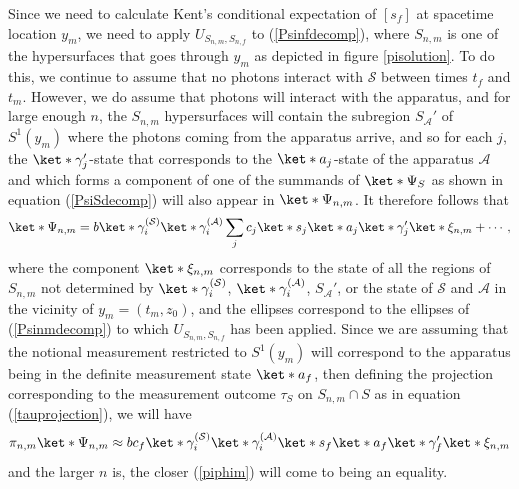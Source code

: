 \documentclass[12pt]{report}
\begin{document}
Since we need to calculate Kent's conditional expectation of $[s_f]$ at spacetime location $y_m$, we need to apply  $U_{S_{n,m},S_{n,f}}$ to (\ref{Psinfdecomp}), where $S_{n,m}$ %
%
 is one of the hypersurfaces that goes through $y_m$ as depicted in figure \ref{pisolution}. To do this, we continue to assume that no photons interact with $\mathcal{S}$ between times $t_f$ and $t_m$. However, we do assume that photons will interact with the apparatus, and for large enough $n$, the $S_{n,m}$ hypersurfaces will contain the subregion $S_{\mathcal{A}}'$ of $S^1(y_m)$ where the photons coming from the apparatus arrive, and so for each $j$, the $\ket*{\gamma_j'}$-state %
%
 that corresponds to the $\ket*{a_j}$-state of the apparatus $\mathcal{A}$ and which forms a component of one of the summands of $\ket*{\Psi_S}$ as shown in equation (\ref{PsiSdecomp}) will also appear in $\ket*{\Psi_{n,m}}$. It therefore follows that 
\begin{equation}\label{Psinmdecomp}
	\ket*{\Psi_{n,m}}=b\ket*{\gamma_i^{(\mathcal{S})}}\ket*{\gamma_i^{(\mathcal{A})}}\sum_j c_j \ket*{s_j}\ket*{a_j}\ket*{\gamma_j'}\ket*{\xi_{n,m}}+\cdots,
\end{equation} 
where the component $\ket*{\xi_{n,m}}$ %
%
 corresponds to the state of all the regions of $S_{n,m}$ not determined by $\ket*{\gamma_i^{(\mathcal{S})}}$, $\ket*{\gamma_i^{(\mathcal{A})}}$,  $S_{\mathcal{A}}'$, or the state of $\mathcal{S}$ and $\mathcal{A}$ in the vicinity of $y_m=(t_m, z_0)$, and the ellipses correspond to the ellipses of (\ref{Psinmdecomp}) to which $U_{S_{n,m},S_{n,f}}$ has been applied. Since we are assuming that the notional measurement restricted to $S^1(y_m)$ will correspond to the apparatus being in the definite measurement state $\ket*{a_f}$, then defining the projection corresponding to the measurement outcome $\tau_S$ on $S_{n,m}\cap S$ as in equation (\ref{tauprojection}), we will have
\begin{equation}\label{piphim}
\pi_{n,m}\ket*{\Psi_{n,m}}\approx b c_f \ket*{\gamma_i^{(\mathcal{S})}}\ket*{\gamma_i^{(\mathcal{A})}}\ket*{s_f}\ket*{a_f}\ket*{\gamma_f'}\ket*{\xi_{n,m}}
\end{equation}
and the larger $n$ is, the closer (\ref{piphim}) will come to being an equality. 
\end{document}
